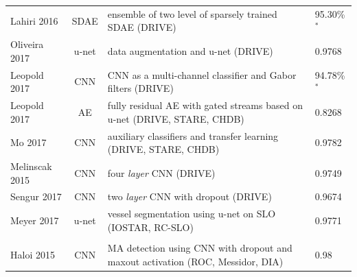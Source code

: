 \documentclass[journal]{IEEEtran}
\begin{document}
\begin{table}[!t]
\begin{minipage}{\textwidth}
\begin{tabularx}{\textwidth}{l c l l}
			Lahiri 2016\cite{lahiri2016deep}                 & SDAE           & ensemble of two level of sparsely trained SDAE (DRIVE)                                             & 95.30\%$^*$                                   \\
			Oliveira 2017\cite{oliveira2017augmenting}       & u-net          & data augmentation and u-net (DRIVE)                                                                & 0.9768                                       \\
			Leopold 2017\cite{leopold2017use}                & CNN            & CNN as a multi-channel classifier and Gabor filters (DRIVE)                                        & 94.78\%$^*$                                   \\
			Leopold 2017\cite{leopold2017pixelbnn}           & AE             & fully residual AE with gated streams based on u-net (DRIVE, STARE, CHDB)                           & 0.8268                                       \\
			Mo 2017\cite{mo2017multi}                        & CNN            & auxiliary classifiers and transfer learning (DRIVE, STARE, CHDB)                                   & 0.9782                                       \\
			Melinscak 2015\cite{melinvsvcak2015retinal}      & CNN            & four \textit{layer} CNN (DRIVE)                                                                    & 0.9749                                       \\
			Sengur 2017\cite{sengur2017retinal}              & CNN            & two \textit{layer} CNN with dropout (DRIVE)                                                        & 0.9674                                       \\
			Meyer 2017\cite{meyer2017deep}                   & u-net          & vessel segmentation using u-net on SLO (IOSTAR, RC-SLO)                                            & 0.9771                                       \\
			\midrule
			\multicolumn{4}{l}{\thead{Microaneurysm and hemorrhage detection}}                                                                                                                                                     \\
			\midrule
			Haloi 2015\cite{haloi2015improved}               & CNN            & MA detection using CNN with dropout and maxout activation (ROC, Messidor, DIA)                     & 0.98                                          \\

\end{tabularx}
\end{minipage}
\end{table}
\end{document}

